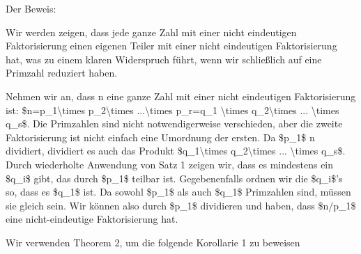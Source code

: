 \documentclass[a4paper]{article}
\begin{document}
\begin{multicols}{3}
\begin{itemize*}
            \begin{itemize*}
                  \item Der Beweis:
                  \begin{itemize*} \item Wir werden zeigen, dass jede ganze Zahl mit einer nicht eindeutigen Faktorisierung einen eigenen Teiler mit einer nicht eindeutigen Faktorisierung hat, was zu einem klaren Widerspruch führt, wenn wir schließlich auf eine Primzahl reduziert haben. \item Nehmen wir an, dass n eine ganze Zahl mit einer nicht eindeutigen Faktorisierung ist: \$n=p\_1\textbackslash times p\_2\textbackslash times ...\textbackslash times p\_r=q\_1 \textbackslash times q\_2\textbackslash times ... \textbackslash times q\_s\$. Die Primzahlen sind nicht notwendigerweise verschieden, aber die zweite Faktorisierung ist nicht einfach eine Umordnung der ersten. Da \$p\_1\$ n dividiert, dividiert es auch das Produkt \$q\_1\textbackslash times q\_2\textbackslash times ... \textbackslash times q\_s\$. Durch wiederholte Anwendung von Satz 1 zeigen wir, dass es mindestens ein \$q\_i\$ gibt, das durch \$p\_1\$ teilbar ist. Gegebenenfalls ordnen wir die \$q\_i\$'s so, dass es \$q\_1\$ ist. Da sowohl \$p\_1\$ als auch \$q\_1\$ Primzahlen sind, müssen sie gleich sein. Wir können also durch \$p\_1\$ dividieren und haben, dass \$n/p\_1\$ eine nicht-eindeutige Faktorisierung hat. \end{itemize*}
                  \item Wir verwenden Theorem 2, um die folgende Korollarie 1 zu beweisen

\end{itemize*}
\end{itemize*}
\end{multicols}
\end{document}
